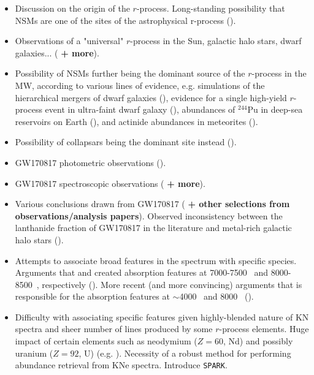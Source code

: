 \documentclass[twocolumn]{aastex63}
\begin{document}
\begin{itemize}
    \item Discussion on the origin of the $r$-process. Long-standing possibility that NSMs are one of the sites of the astrophysical r-process (\citealt{lattimer74, eichler89, freiburghaus99}). 

    \item Observations of a "universal" $r$-process in the Sun, galactic halo stars, dwarf galaxies... (\citealt{sneden08, ji16, cote18} \textbf{+ more}).
    
    \item Possibility of NSMs further being the dominant source of the $r$-process in the MW, according to various lines of evidence, e.g. simulations of the hierarchical mergers of dwarf galaxies (\citealt{ishimaru15}), evidence for a single high-yield $r$-process event in ultra-faint dwarf galaxy  (\citealt{ji16, roederer16}),  abundances of $^{244}$Pu in deep-sea reservoirs on Earth (\citealt{wallner15}), and actinide abundances in meteorites (\citealt{bartos19}).
    
    
    \item Possibility of collapsars being the dominant site instead (\citealt{siegel19}).
    
    
    \item GW170817 photometric observations (\citealt{andreoni17, arcavi17, coulter17, diaz17, drout17, evans17, hu17, kasliwal17, lipunov17, shappee17, tanvir17, troja17, utsumi17, valenti17}).
    
    \item GW170817 spectroscopic observations (\citealt{chornock17, kasen17, pian17, smartt17, cote18} \textbf{+ more}). 
    
    
    \item Various conclusions drawn from GW170817 (\citealt{kasen17, smartt17, cote18, rosswog18} \textbf{+ other selections from observations/analysis papers}). Observed inconsistency between the lanthanide fraction of GW170817 in the literature and metal-rich galactic halo stars (\citealt{ji19}).

    
    \item Attempts to associate broad features in the spectrum with specific species. Arguments that  and  created absorption features at 7000-7500~\text{\AA} and 8000-8500~\text{\AA}, respectively (\citealt{smartt17}). More recent (and more convincing) arguments that  is responsible for the absorption features at $\sim$4000~\text{\AA} and 8000~\text{\AA} (\citealt{watson19}).
    
    \item Difficulty with associating specific features given highly-blended nature of KN spectra and sheer number of lines produced by some $r$-process elements. Huge impact of certain elements such as neodymium ($Z=60$, Nd) and possibly uranium ($Z=92$, U) (e.g. \citealt{kasen17, even19}). Necessity of a robust method for performing abundance retrieval from KNe spectra. Introduce \texttt{SPARK}.
\end{itemize}
\end{document}
